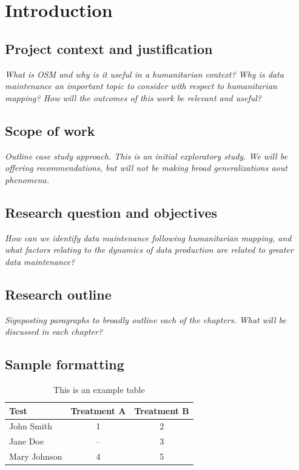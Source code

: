 \chapter{Introduction}
\label{chapterlabel1}

\section{Project context and justification}

\textit{What is OSM and why is it useful in a humanitarian context? Why is data maintenance an important topic to consider with respect to humanitarian mapping? How will the outcomes of this work be relevant and useful?}

\section{Scope of work}

\textit{Outline case study approach. This is an initial exploratory study. We will be offering recommendations, but will not be making broad generalizations aout phenomena.}

\section{Research question and objectives}

\textit{How can we identify data maintenance following humanitarian mapping, and what factors relating to the dynamics of data production are related to greater data maintenance?}

\section{Research outline}

\textit{Signposting paragraphs to broadly outline each of the chapters. What will be discussed in each chapter?}

\section{Sample formatting}

\begin{table}[ht]
\centering
\caption{This is an example table}
\begin{tabular}[t]{lcc}
\toprule
Test&Treatment A&Treatment B\\
\midrule
John Smith&1&2\\
Jane Doe&--&3\\
Mary Johnson&4&5\\
\bottomrule
\end{tabular}
\end{table}%

